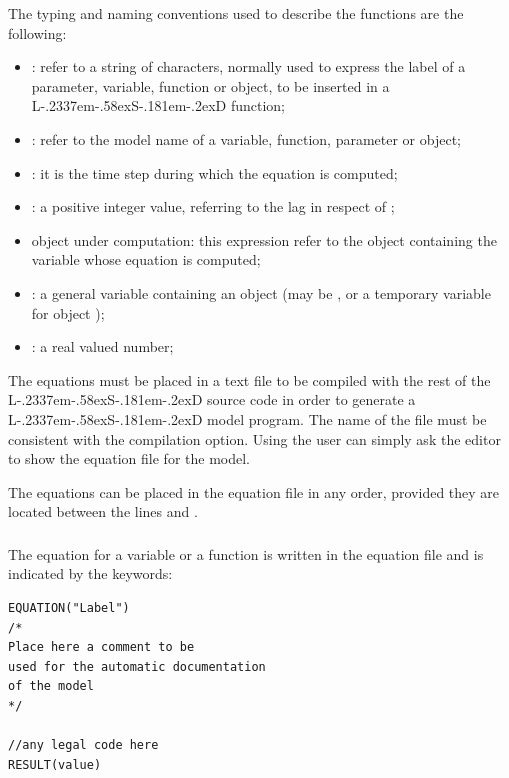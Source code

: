 \documentclass [11pt,a4paper] {book}
\def\LsD{{L\kern-.2337em\lower-.58ex\hbox{S}\kern-.181em\lower-.2ex\hbox{D}}\xspace}
\begin{document}
The typing and naming conventions used to describe the functions are the following:
\begin{itemize}
  \item {}: refer to a string of characters, normally used to express the label of a
  parameter, variable, function or object, to be inserted in a \LsD function;
  \item {}: refer to the model name of a variable, function, parameter or object;
  \item {}: it is the time step during which the equation is computed;
  \item {}: a positive integer value, referring to the lag in respect of
  ;
  \item object under computation: this expression refer to the object  containing the
  variable whose equation is computed;
  \item {}: a general variable containing an object (may be , or a
temporary variable for object );
  \item {}: a real valued number;
\end{itemize}

The equations must be placed in a text file to be compiled with the rest of the \LsD source code in order to generate a \LsD model program. The name of the file must be consistent with the compilation option. Using  the user can simply ask the editor to show the equation file for the model.

The equations can be placed in the equation file in any order, provided they are located between the lines  and .


\subsubsection{ }

The equation for a variable or a function is written in the equation file and is indicated by the keywords:

\begin{minipage}[h]{10cm}
\small
\begin{verbatim}
EQUATION("Label")
/*
Place here a comment to be
used for the automatic documentation
of the model
*/

//any legal code here
RESULT(value)

\end{verbatim}
\normalsize
\end{minipage}
\end{document}
